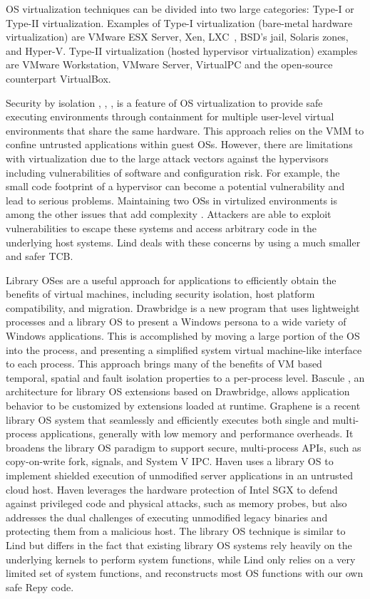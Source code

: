 OS virtualization techniques can be divided into two large categories:
Type-I or Type-II virtualization. Examples of Type-I virtualization
(bare-metal hardware virtualization) are VMware ESX Server, Xen,
LXC~\cite{LXC}, BSD’s jail, Solaris zones, and Hyper-V. Type-II
virtualization (hosted hypervisor virtualization) examples are VMware
Workstation, VMware Server, VirtualPC and the open-source counterpart
VirtualBox.


Security by isolation \cite{Qubes}, \cite{Overshadow},
\cite{SecureVM}, \cite{HypSec} is a feature of OS virtualization to
provide safe executing environments through containment for multiple
user-level virtual environments that share the same hardware. This
approach relies on the VMM to confine untrusted applications within
guest OSs. However, there are limitations with virtualization due to
the large attack vectors against the hypervisors including
vulnerabilities of software and configuration risk. For example, the
small code footprint of a hypervisor can become a potential
vulnerability and lead to serious problems. Maintaining two OSs in
virtulized environments is among the other issues that add complexity
\cite{Virt-Issues}. Attackers are able to exploit vulnerabilities to
escape these systems and access arbitrary code in the underlying host
systems. Lind deals with these concerns by using a much smaller and
safer TCB.

Library OSes are a useful approach for applications to efficiently
obtain the benefits of virtual machines,
including security isolation, host platform compatibility, and
migration. Drawbridge \cite{Drawbridge-11} is a new program
that uses lightweight processes and a library OS to present a Windows
persona to a wide variety of Windows applications.
This is accomplished by moving a large portion of the OS into the
process, and presenting a simplified system
virtual machine-like interface to each process. This approach brings
many of the benefits of VM based temporal,
spatial and fault isolation properties to a per-process level. Bascule
\cite{Bascule}, an architecture for library OS extensions
based on Drawbridge, allows application behavior to be customized by
extensions loaded at runtime.
Graphene \cite{Graphene-14} is a recent library OS system that
seamlessly and efficiently executes both single and
multi-process applications, generally with low memory and performance
overheads.
It broadens the library OS paradigm to support secure, multi-process
APIs, such as copy-on-write fork, signals,
and System V IPC. Haven \cite{Haven} uses a library OS to implement
shielded execution of unmodified server applications
in an untrusted cloud host. Haven leverages the hardware protection of
Intel SGX to defend against
privileged code and physical attacks, such as memory probes, but also
addresses the dual challenges of
executing unmodified legacy binaries and protecting them from a
malicious host.
The library OS technique is similar to Lind but differs in the fact
that existing library OS systems rely heavily on
the underlying kernels to perform system functions, while Lind only
relies on a very limited set of system functions,
and reconstructs most OS functions with our own safe Repy code. 

